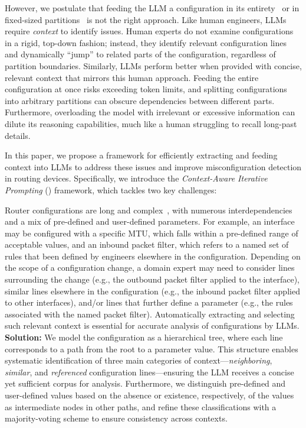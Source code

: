 However, we postulate that feeding the LLM a configuration in its entirety~\cite{} or in fixed-sized partitions~\cite{} is not the right approach. Like human engineers, LLMs require \emph{context} to identify issues. Human experts do not examine configurations in a rigid, top-down fashion; instead, they identify relevant configuration lines and dynamically ``jump'' to related parts of the configuration, regardless of partition boundaries. Similarly, LLMs perform better when provided with concise, relevant context that mirrors this human approach. Feeding the entire configuration at once risks exceeding token limits, and splitting configurations into arbitrary partitions can obscure dependencies between different parts. Furthermore, overloading the model with irrelevant or excessive information can dilute its reasoning capabilities, much like a human struggling to recall long-past details.

In this paper, we propose a framework for efficiently extracting and feeding context into LLMs to address these issues and improve misconfiguration detection in routing devices. Specifically, we introduce the \emph{Context-Aware Iterative Prompting} (\sysname{}) framework, which tackles two key challenges:

 Router configurations are long and complex~\cite{benson2009complexitymetrics}, with numerous interdependencies and a mix of pre-defined and user-defined parameters. For example, an interface may be configured with a specific MTU, which falls within a pre-defined range of acceptable values, and an inbound packet filter, which refers to a named set of rules that been defined by engineers elsewhere in the configuration. Depending on the scope of a configuration change, a domain expert may need to consider lines surrounding the change (e.g., the outbound packet filter applied to the interface), similar lines elsewhere in the configuration (e.g., the inbound packet filter applied to other interfaces), and/or lines that further define a parameter (e.g., the rules associated with the named packet filter). Automatically extracting and selecting such relevant context is essential for accurate analysis of configurations by LLMs. 
\textbf{Solution:} We model the configuration as a hierarchical tree, where each line corresponds to a path from the root to a parameter value. This structure enables systematic identification of three main categories of context---\emph{neighboring}, \emph{similar}, and \emph{referenced} configuration lines—ensuring the LLM receives a concise yet sufficient corpus for analysis. Furthermore, we distinguish pre-defined and user-defined values based on the absence or existence, respectively, of the values as intermediate nodes in other paths, and refine these classifications with a majority-voting scheme to ensure consistency across contexts.



